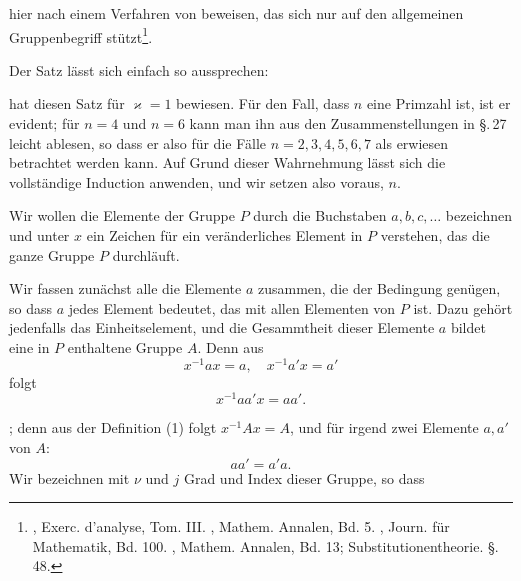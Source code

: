 hier nach einem Verfahren von  beweisen, das sich
nur auf den allgemeinen Gruppenbegriff stützt\footnote{, Exerc. d'analyse, Tom. III. , Mathem. Annalen, Bd. 5. , Journ. für Mathematik, Bd. 100. , Mathem. Annalen, Bd. 13; Substitutionentheorie. \S.\,48.}.

Der Satz lässt sich einfach so aussprechen:


 hat diesen Satz für $\varkappa = 1$ bewiesen. Für den Fall, dass $n$ eine Primzahl ist, ist er evident; für $n = 4$ und $n = 6$ kann man ihn aus den Zusammenstellungen in \S.\,27 leicht ablesen, so dass er also für die Fälle $n = 2, 3, 4, 5, 6, 7$ als erwiesen betrachtet werden kann. Auf Grund dieser Wahrnehmung lässt sich die vollständige Induction anwenden, und wir setzen also voraus,  $n$.

Wir wollen die Elemente der Gruppe $P$ durch die Buchstaben $a, b, c, \ldots$ bezeichnen und unter $x$ ein Zeichen für ein veränderliches Element in $P$ verstehen, das die ganze Gruppe $P$ durchläuft.

Wir fassen zunächst alle die Elemente $a$ zusammen, die der Bedingung
genügen, so dass $a$ jedes Element bedeutet, das mit allen Elementen von $P$  ist. Dazu gehört jedenfalls das Einheitselement, und die Gesammtheit dieser Elemente $a$ bildet eine in $P$ enthaltene Gruppe $A$. Denn aus
\[ x^{-1}ax = a,\quad x^{-1}a'x = a' \]
folgt
\[ x^{-1}aa'x = aa'. \]

; denn aus der Definition (1) folgt $x^{-1}Ax = A$, und für irgend zwei Elemente $a, a'$ von $A$:
\[ aa' = a'a. \]
Wir bezeichnen mit $\nu$ und $j$ Grad und Index dieser Gruppe, so dass
